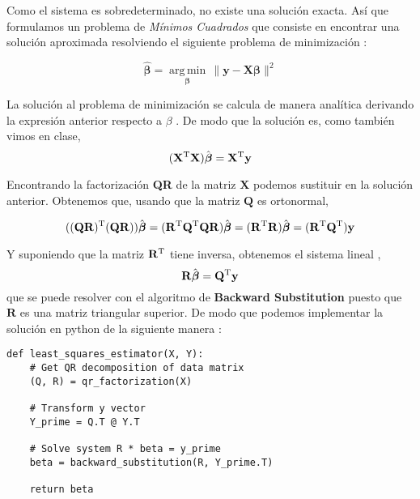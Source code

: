 \documentclass[12pt,letterpaper]{article}
\begin{document}
Como el sistema es sobredeterminado, no existe una soluci\'on exacta. As\'i que formulamos un problema de \textit{M\'inimos Cuadrados} que consiste en encontrar una soluci\'on aproximada resolviendo el siguiente problema de minimizaci\'on :

\begin{equation}
\hat{\boldsymbol{\beta}} = \underset{\boldsymbol{\beta}}{\operatorname{arg\,min}}\,\bigl\|\mathbf y - \mathbf X \boldsymbol \beta \bigr\|^2
\end{equation}

La soluci\'on al problema de minimizaci\'on se calcula de manera anal\'itica derivando la expresi\'on anterior respecto a $\beta$ . De modo que la soluci\'on es, como tambi\'en vimos en clase,
\begin{equation}
(\mathbf X^{\rm T} \mathbf X )\hat{\boldsymbol{\beta}}= \mathbf X^{\rm T} \mathbf y
\end{equation}

Encontrando la factorizaci\'on \textbf{QR} de la matriz $\mathbf {X}$ podemos sustituir en la soluci\'on anterior. Obtenemos que, usando que la matriz $\mathbf{Q}$ es ortonormal,

\begin{equation}
((\mathbf Q \mathbf R )^{\rm T} (\mathbf Q \mathbf R ) )\hat{\boldsymbol{\beta}} = 
( \mathbf R ^{\rm T} \mathbf Q^{\rm T} \mathbf Q \mathbf R  )\hat{\boldsymbol{\beta}} =
( \mathbf R ^{\rm T} \mathbf R  )\hat{\boldsymbol{\beta}} =
( \mathbf R ^{\rm T} \mathbf Q ^{\rm T} ) \mathbf y
\end{equation}

Y suponiendo que la matriz $\mathbf R ^{\rm T}$ tiene inversa, obtenemos el sistema lineal ,
\begin{equation}
\mathbf R \hat{\boldsymbol{\beta}} = \mathbf Q ^{\rm T} \mathbf y
\end{equation}
que se puede resolver con el algoritmo de \textbf{Backward Substitution} puesto que $\mathbf R$ es una matriz triangular superior. De modo que podemos implementar la soluci\'on en python de la siguiente manera :

\begin{lstlisting}[style = Python]
def least_squares_estimator(X, Y):
    # Get QR decomposition of data matrix
    (Q, R) = qr_factorization(X)

    # Transform y vector
    Y_prime = Q.T @ Y.T

    # Solve system R * beta = y_prime
    beta = backward_substitution(R, Y_prime.T)

    return beta
\end{lstlisting}
\end{document}
